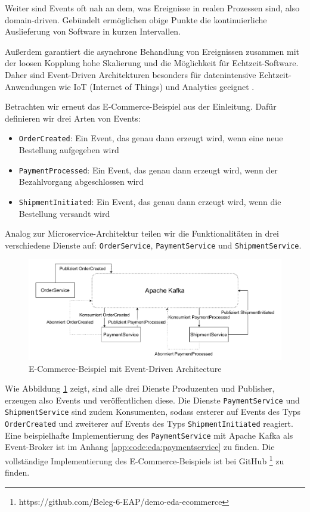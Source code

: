 \documentclass[acmtog]{acmart}
\begin{document}
Weiter sind Events oft nah an dem, was Ereignisse in realen Prozessen sind, also domain-driven.
Gebündelt ermöglichen obige Punkte die kontinuierliche Auslieferung von Software in kurzen Intervallen.

Außerdem garantiert die asynchrone Behandlung von Ereignissen zusammen mit der loosen Kopplung hohe Skalierung und die Möglichkeit für Echtzeit-Software.
Daher sind Event-Driven Architekturen besonders für datenintensive Echtzeit-Anwendungen wie IoT (Internet of Things) und Analytics geeignet \cite{iotEda}.

Betrachten wir erneut das E-Commerce-Beispiel aus der Einleitung.
Dafür definieren wir drei Arten von Events:
\begin{itemize}
  \item \texttt{OrderCreated}: Ein Event, das genau dann erzeugt wird, wenn eine neue Bestellung aufgegeben wird
  \item \texttt{PaymentProcessed}: Ein Event, das genau dann erzeugt wird, wenn der Bezahlvorgang abgeschlossen wird
  \item \texttt{ShipmentInitiated}: Ein Event, das genau dann erzeugt wird, wenn die Bestellung versandt wird
\end{itemize}

Analog zur Microservice-Architektur teilen wir die Funktionalitäten in drei verschiedene Dienste auf: \texttt{OrderService}, \texttt{PaymentService} und \texttt{ShipmentService}.

\begin{figure}[!h]
  \centering
  \includegraphics[width=\linewidth]{images/eda/eda-ecommerce.drawio}
  \caption{E-Commerce-Beispiel mit Event-Driven Architecture}
  \label{fig:edaecommerce}
\end{figure}
Wie Abbildung \ref{fig:edaecommerce} zeigt, sind alle drei Dienste Produzenten und Publisher, erzeugen also Events und veröffentlichen diese.
Die Dienste \texttt{PaymentService} und \texttt{ShipmentService} sind zudem Konsumenten,
sodass ersterer auf Events des Typs \texttt{OrderCreated} und zweiterer auf Events des Typs \texttt{ShipmentInitiated} reagiert.
Eine beispielhafte Implementierung des \texttt{PaymentService} mit Apache Kafka als Event-Broker ist im Anhang \ref{app:code:eda:paymentservice} zu finden.
Die vollständige Implementierung des E-Commerce-Beispiels ist bei GitHub \footnote{https://github.com/Beleg-6-EAP/demo-eda-ecommerce} zu finden.
\end{document}
